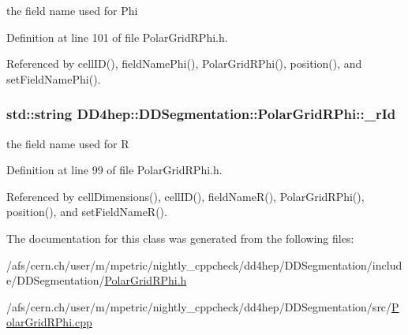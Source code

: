 the field name used for Phi 

Definition at line 101 of file PolarGridRPhi.h.

Referenced by cellID(), fieldNamePhi(), PolarGridRPhi(), position(), and setFieldNamePhi().\hypertarget{class_d_d4hep_1_1_d_d_segmentation_1_1_polar_grid_r_phi_a8a4e4aea0a7943c8e77c1f9c8bdc5ffc}{
\subsubsection[{\_\-rId}]{\setlength{\rightskip}{0pt plus 5cm}std::string {\bf DD4hep::DDSegmentation::PolarGridRPhi::\_\-rId}}}
\label{class_d_d4hep_1_1_d_d_segmentation_1_1_polar_grid_r_phi_a8a4e4aea0a7943c8e77c1f9c8bdc5ffc}


the field name used for R 

Definition at line 99 of file PolarGridRPhi.h.

Referenced by cellDimensions(), cellID(), fieldNameR(), PolarGridRPhi(), position(), and setFieldNameR().

The documentation for this class was generated from the following files:\begin{DoxyCompactItemize}
\item 
/afs/cern.ch/user/m/mpetric/nightly\_\-cppcheck/dd4hep/DDSegmentation/include/DDSegmentation/\hyperlink{_d_d_segmentation_2include_2_d_d_segmentation_2_polar_grid_r_phi_8h}{PolarGridRPhi.h}\item 
/afs/cern.ch/user/m/mpetric/nightly\_\-cppcheck/dd4hep/DDSegmentation/src/\hyperlink{_d_d_segmentation_2src_2_polar_grid_r_phi_8cpp}{PolarGridRPhi.cpp}\end{DoxyCompactItemize}
